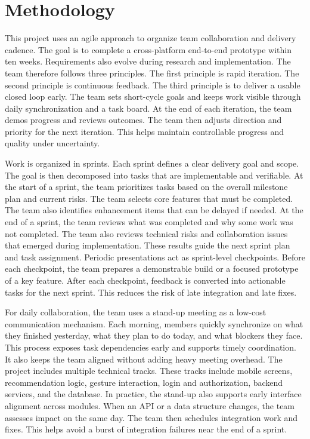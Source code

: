 \documentclass[journal]{IEEEtran}
\begin{document}
\section{Methodology}

This project uses an agile approach to organize team collaboration and delivery cadence. The goal is to complete a cross-platform end-to-end prototype within ten weeks. Requirements also evolve during research and implementation. The team therefore follows three principles. The first principle is rapid iteration. The second principle is continuous feedback. The third principle is to deliver a usable closed loop early. The team sets short-cycle goals and keeps work visible through daily synchronization and a task board. At the end of each iteration, the team demos progress and reviews outcomes. The team then adjusts direction and priority for the next iteration. This helps maintain controllable progress and quality under uncertainty.

Work is organized in sprints. Each sprint defines a clear delivery goal and scope. The goal is then decomposed into tasks that are implementable and verifiable. At the start of a sprint, the team prioritizes tasks based on the overall milestone plan and current risks. The team selects core features that must be completed. The team also identifies enhancement items that can be delayed if needed. At the end of a sprint, the team reviews what was completed and why some work was not completed. The team also reviews technical risks and collaboration issues that emerged during implementation. These results guide the next sprint plan and task assignment. Periodic presentations act as sprint-level checkpoints. Before each checkpoint, the team prepares a demonstrable build or a focused prototype of a key feature. After each checkpoint, feedback is converted into actionable tasks for the next sprint. This reduces the risk of late integration and late fixes.

For daily collaboration, the team uses a stand-up meeting as a low-cost communication mechanism. Each morning, members quickly synchronize on what they finished yesterday, what they plan to do today, and what blockers they face. This process exposes task dependencies early and supports timely coordination. It also keeps the team aligned without adding heavy meeting overhead. The project includes multiple technical tracks. These tracks include mobile screens, recommendation logic, gesture interaction, login and authorization, backend services, and the database. In practice, the stand-up also supports early interface alignment across modules. When an API or a data structure changes, the team assesses impact on the same day. The team then schedules integration work and fixes. This helps avoid a burst of integration failures near the end of a sprint.
\end{document}
